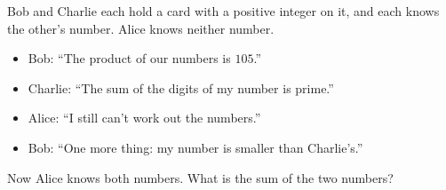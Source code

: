 Bob and Charlie each hold a card with a positive integer on it, and each knows the other's number. Alice knows neither number.
\begin{itemize}
\item Bob: ``The product of our numbers is $105$.''
\item Charlie: ``The sum of the digits of my number is prime.''
\item Alice: ``I still can't work out the numbers.''
\item Bob: ``One more thing: my number is smaller than Charlie's.''
\end{itemize}
Now Alice knows both numbers. What is the sum of the two numbers?
